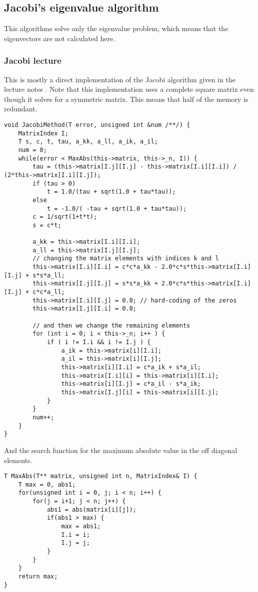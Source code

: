 \documentclass[11pt,english,a4paper]{article}
\begin{document}
\begin{flushleft}
\subsection{Jacobi's eigenvalue algorithm}

This algorithms solve only the eigenvalue problem, which means that the eigenvectors are not calculated here.

\subsubsection{Jacobi lecture} \label{sec_Jacobi_lecture}

This is mostly a direct implementation of the Jacobi algorithm given in the lecture notes \cite[p. 218]{lecture}. Note that this implementation uses a complete square matrix even though it solves for a symmetric matrix. This means that half of the memory is redundant.

\begin{lstlisting}[title={\texttt{template<class T> class Matrix<MatrixType::Square, T>::JacobiMethod}}]
void JacobiMethod(T error, unsigned int &num /**/) {
	MatrixIndex I;
	T s, c, t, tau, a_kk, a_ll, a_ik, a_il;
	num = 0;
	while(error < MaxAbs(this->matrix, this->_n, I)) {
		tau = (this->matrix[I.j][I.j] - this->matrix[I.i][I.i]) / (2*this->matrix[I.i][I.j]);
		if (tau > 0)
			t = 1.0/(tau + sqrt(1.0 + tau*tau));
		else
			t = -1.0/( -tau + sqrt(1.0 + tau*tau));
		c = 1/sqrt(1+t*t);
		s = c*t;
		
		a_kk = this->matrix[I.i][I.i];
		a_ll = this->matrix[I.j][I.j];
		// changing the matrix elements with indices k and l
		this->matrix[I.i][I.i] = c*c*a_kk - 2.0*c*s*this->matrix[I.i][I.j] + s*s*a_ll;
		this->matrix[I.j][I.j] = s*s*a_kk + 2.0*c*s*this->matrix[I.i][I.j] + c*c*a_ll;
		this->matrix[I.i][I.j] = 0.0; // hard-coding of the zeros
		this->matrix[I.j][I.i] = 0.0;
		
		// and then we change the remaining elements
		for (int i = 0; i < this->_n; i++ ) {
			if ( i != I.i && i != I.j ) {
				a_ik = this->matrix[i][I.i];
				a_il = this->matrix[i][I.j];
				this->matrix[i][I.i] = c*a_ik + s*a_il;
				this->matrix[I.i][i] = this->matrix[i][I.i];
				this->matrix[i][I.j] = c*a_il - s*a_ik;
				this->matrix[I.j][i] = this->matrix[i][I.j];
			}
		}
		num++;
	}
}
\end{lstlisting}

And the search function for the maximum absolute value in the off diagonal elements.

\begin{lstlisting}[title={\texttt{Matrix<MatrixType::Square, T>::MaxAbs}}]
T MaxAbs(T** matrix, unsigned int n, MatrixIndex& I) {
	T max = 0, abs1;
	for(unsigned int i = 0, j; i < n; i++) {
		for(j = i+1; j < n; j++) {
			abs1 = abs(matrix[i][j]);
			if(abs1 > max) {
				max = abs1;
				I.i = i;            
				I.j = j;            
			}
		}
	}
	return max;
}
\end{lstlisting}


\end{flushleft}
\end{document}
